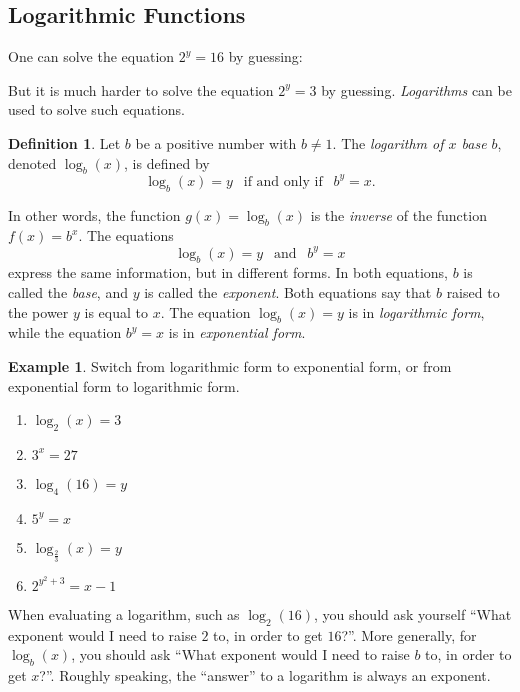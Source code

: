 \documentclass[letterpaper,12pt,oneside]{book}
\theoremstyle{definition}
\newtheorem{definition}[theorem]{Definition}
\newtheorem{example}[theorem]{Example}
\begin{document}
{\subsection*{Logarithmic Functions}

\noindent
One can solve the equation $2^y=16$ by guessing:

\vspace{1cm}

\noindent
But it is much harder to solve the equation $2^y=3$ by guessing.  \emph{Logarithms} can be used to solve such equations.

\begin{definition}
Let $b$ be a positive number with $b\neq 1$.  The \emph{logarithm of $x$ base $b$}, denoted $\log_b(x)$, is defined by
\[
\log_b(x)=y \ \  \text{ if and only if } \ \  b^y=x.
\]
\end{definition}

In other words, the function $g(x)=\log_b(x)$ is the \emph{inverse} of the function $f(x)=b^x$.  The equations 
\[
\log_b(x)=y \ \  \mbox{ and } \ \   b^y=x
\]
express the same information, but in different forms.  In both equations, $b$ is called the \emph{base}, and $y$ is called the \emph{exponent}.  Both equations say that $b$ raised to the power $y$ is equal to $x$. The equation $\log_b(x)=y$ is in \emph{logarithmic form}, while the equation $b^y=x$ is in \emph{exponential form}.

\begin{example}
Switch from logarithmic form to exponential form, or from exponential form to logarithmic form.
\begin{multicols}{2}
\begin{enumerate}
\item $\log_2(x)=3$
\item $3^x=27$
\item $\log_{4}(16)=y$
\item $5^y=x$
\item $\log_{\tfrac{2}{3}}(x)=y$
\item $2^{y^2+3}=x-1$
\end{enumerate}
\end{multicols}
\end{example}

When evaluating a logarithm, such as $\log_2(16)$, you should ask yourself ``What exponent would I need to raise $2$ to, in order to get $16$?''.  More generally, for $\log_b(x)$, you should ask ``What exponent would I need to raise $b$ to, in order to get $x$?''.  Roughly speaking, the ``answer'' to a logarithm is always an exponent.

}
\end{document}
